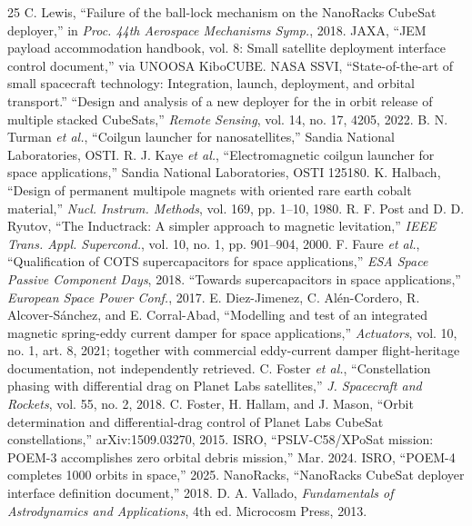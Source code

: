 \documentclass[conference]{IEEEtran}
\begin{document}
\begin{thebibliography}{25}
 C. Lewis, ``Failure of the ball-lock mechanism on the NanoRacks CubeSat deployer,'' in \emph{Proc. 44th Aerospace Mechanisms Symp.}, 2018.
 JAXA, ``JEM payload accommodation handbook, vol. 8: Small satellite deployment interface control document,'' via UNOOSA KiboCUBE.
 NASA SSVI, ``State-of-the-art of small spacecraft technology: Integration, launch, deployment, and orbital transport.''
 ``Design and analysis of a new deployer for the in orbit release of multiple stacked CubeSats,'' \emph{Remote Sensing}, vol. 14, no. 17, 4205, 2022.
 B. N. Turman \emph{et al.}, ``Coilgun launcher for nanosatellites,'' Sandia National Laboratories, OSTI.
 R. J. Kaye \emph{et al.}, ``Electromagnetic coilgun launcher for space applications,'' Sandia National Laboratories, OSTI 125180.
 K. Halbach, ``Design of permanent multipole magnets with oriented rare earth cobalt material,'' \emph{Nucl. Instrum. Methods}, vol. 169, pp. 1--10, 1980.
 R. F. Post and D. D. Ryutov, ``The Inductrack: A simpler approach to magnetic levitation,'' \emph{IEEE Trans. Appl. Supercond.}, vol. 10, no. 1, pp. 901--904, 2000.
 F. Faure \emph{et al.}, ``Qualification of COTS supercapacitors for space applications,'' \emph{ESA Space Passive Component Days}, 2018.
 ``Towards supercapacitors in space applications,'' \emph{European Space Power Conf.}, 2017.
 E. Diez-Jimenez, C. Al\'en-Cordero, R. Alcover-S\'anchez, and E. Corral-Abad, ``Modelling and test of an integrated magnetic spring-eddy current damper for space applications,'' \emph{Actuators}, vol. 10, no. 1, art. 8, 2021; together with commercial eddy-current damper flight-heritage documentation, not independently retrieved.
 C. Foster \emph{et al.}, ``Constellation phasing with differential drag on Planet Labs satellites,'' \emph{J. Spacecraft and Rockets}, vol. 55, no. 2, 2018.
 C. Foster, H. Hallam, and J. Mason, ``Orbit determination and differential-drag control of Planet Labs CubeSat constellations,'' arXiv:1509.03270, 2015.
 ISRO, ``PSLV-C58/XPoSat mission: POEM-3 accomplishes zero orbital debris mission,'' Mar. 2024.
 ISRO, ``POEM-4 completes 1000 orbits in space,'' 2025.
 NanoRacks, ``NanoRacks CubeSat deployer interface definition document,'' 2018.
 D. A. Vallado, \emph{Fundamentals of Astrodynamics and Applications}, 4th ed. Microcosm Press, 2013.

\end{thebibliography}
\end{document}
